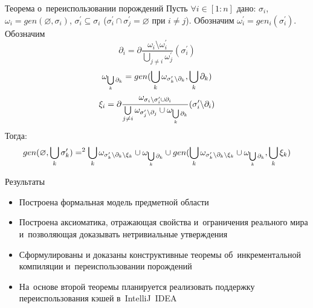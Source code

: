 \begin{frame}{Теорема о~переиспользовании порождений}
Пусть $\forall i \in [1:n]$ дано: $\sigma_i$, $\omega_i = gen(\varnothing, \sigma_i)$, $\sigma_i^\prime \subseteq \sigma_i$ ($\sigma_i^\prime \cap \sigma_j^\prime = \varnothing$ при $i \neq j$). Обозначим $\omega_i^\prime = gen_i(\sigma_i^\prime)$. Обозначим 
$$\partial_i = \partial\dfrac{\omega_i \setminus \omega_i^\prime}{\bigcup\limits_{j \neq i} \omega_j^\prime} (\sigma_i^\prime)$$
$$\omega_{\bigcup\limits_k {\partial_k}} = gen(\bigcup\limits_k \omega_{{\sigma^\prime_k}{\setminus}{\partial_k}}, \bigcup\limits_k {\partial_k})$$
$$\xi_i = \partial\dfrac{\omega_{{\sigma_i}{\setminus}{\sigma^\prime_i} \cup {\partial_i}}}{\bigcup\limits_{j \neq i} \omega_{{\sigma^\prime_j}{\setminus}{\partial_j}} \cup \omega_{\bigcup\limits_k \partial_k}} ({\sigma^\prime_i}{\setminus}{\partial_i})$$
Тогда:
$$gen(\varnothing, \bigcup\limits_k {\sigma^\prime_k}) =^2 \bigcup\limits_k \omega_{{\sigma^\prime_k}{\setminus}{\partial_k}{\setminus}{\xi_k}} \cup \omega_{\bigcup\limits_k \partial_k} \cup gen(\bigcup\limits_k \omega_{{\sigma^\prime_k}{\setminus}{\partial_k}{\setminus}{\xi_k}} \cup \omega_{\bigcup\limits_k \partial_k}, \bigcup\limits_k {\xi_k})$$

\end{frame}

\begin{frame}{Результаты}
\begin{itemize}
	\addtolength{\itemsep}{12pt}
	\item Построена формальная модель предметной области
	\item Построена аксиоматика, отражающая свойства и~ограничения реального мира и~позволяющая доказывать нетривиальные утверждения
	\item Сформулированы и доказаны конструктивные теоремы об~инкрементальной компиляции и~переиспользовании порождений
	\item На~основе второй теоремы планируется реализовать поддержку переиспользования кэшей в~IntelliJ~IDEA
\end{itemize}
\end{frame}


